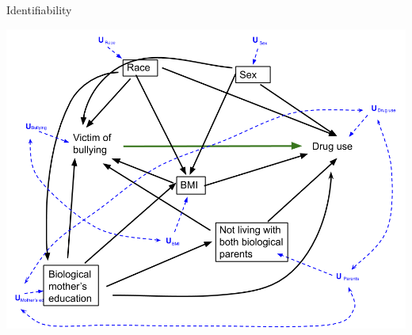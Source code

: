 \documentclass[ignorenonframetext,]{beamer}
\begin{document}
\begin{frame}{Identifiability}

\includegraphics[width=1\linewidth]{DAG Causal Final Project_reduced covariates with Us_final}

\end{frame}
\end{document}
